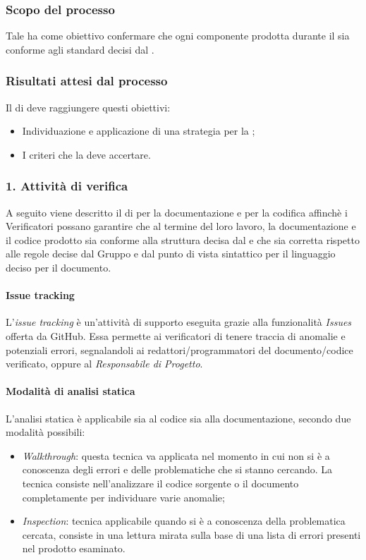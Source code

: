 \subsubsection{Scopo del processo}
Tale  ha come obiettivo confermare che ogni componente prodotta durante il  sia conforme agli standard decisi dal .
\subsubsection{Risultati attesi dal processo}
Il  di  deve raggiungere questi obiettivi:
\begin{itemize}
\item Individuazione e applicazione di una strategia per la ;
\item I criteri che la  deve accertare.
\end{itemize}

\subsubsection{1. Attivit\`a di verifica}
A seguito viene descritto il  di  per la documentazione e per la codifica affinchè i Verificatori possano garantire che al termine del loro lavoro, la documentazione e il codice prodotto sia conforme alla struttura decisa dal  e che sia corretta rispetto alle regole decise dal Gruppo e dal punto di vista sintattico per il linguaggio deciso per il documento.

\paragraph*{Issue tracking}
L'\textit{issue tracking} è un'attività di supporto eseguita grazie alla funzionalità \textit{Issues} offerta da GitHub.
Essa permette ai verificatori di tenere traccia di anomalie e potenziali errori, segnalandoli ai 
redattori/programmatori del documento/codice verificato, oppure al \textit{Responsabile di Progetto}.

\paragraph*{Modalità di analisi statica}
L'analisi statica è applicabile sia al codice sia alla documentazione, secondo due modalità possibili:
\begin{itemize}
  \item \textit{Walkthrough}: questa tecnica va applicata nel momento in cui non si è a conoscenza degli errori
			    e delle problematiche che si stanno cercando. La tecnica consiste nell'analizzare il 
			    codice sorgente o il documento completamente per individuare varie anomalie;
  \item \textit{Inspection}: tecnica applicabile quando si è a conoscenza della problematica cercata, consiste in una lettura
		    	     mirata sulla base di una lista di errori presenti nel prodotto esaminato.
\end{itemize}


